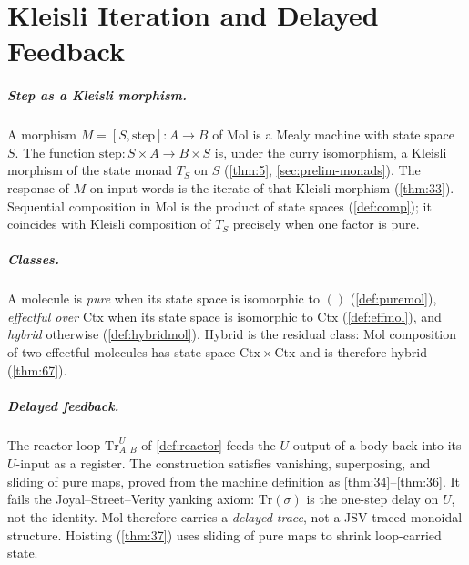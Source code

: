 \chapter{Kleisli Iteration and Delayed Feedback}\label{ch:kleisli}

\paragraph{Step as a Kleisli morphism.}
A morphism $M = [S, \mathrm{step}] : A \to B$ of Mol is a Mealy machine
with state space $S$. The function
$\mathrm{step} : S \times A \to B \times S$ is, under the curry
isomorphism, a Kleisli morphism of the state monad $T_S$ on $S$
(\autoref{thm:5}, \autoref{sec:prelim-monads}). The response of $M$ on
input words is the iterate of that Kleisli morphism
(\autoref{thm:33}). Sequential composition in Mol is the product of
state spaces (\autoref{def:comp}); it coincides with Kleisli
composition of $T_S$ precisely when one factor is pure.

\paragraph{Classes.}
A molecule is \emph{pure} when its state space is isomorphic to $()$
(\autoref{def:puremol}), \emph{effectful over} $\mathrm{Ctx}$ when its
state space is isomorphic to $\mathrm{Ctx}$ (\autoref{def:effmol}), and
\emph{hybrid} otherwise (\autoref{def:hybridmol}). Hybrid is the
residual class: Mol composition of two effectful molecules has state
space $\mathrm{Ctx} \times \mathrm{Ctx}$ and is therefore hybrid
(\autoref{thm:67}).

\paragraph{Delayed feedback.}
The reactor loop $\mathrm{Tr}^{U}_{A,B}$ of \autoref{def:reactor} feeds
the $U$-output of a body back into its $U$-input as a register. The
construction satisfies vanishing, superposing, and sliding of pure maps,
proved from the machine definition as \autoref{thm:34}--\autoref{thm:36}.
It fails the Joyal--Street--Verity yanking axiom: $\mathrm{Tr} (\sigma)$
is the one-step delay on $U$, not the identity. Mol therefore carries a
\emph{delayed trace}, not a JSV traced monoidal structure. Hoisting
(\autoref{thm:37}) uses sliding of pure maps to shrink loop-carried
state.

